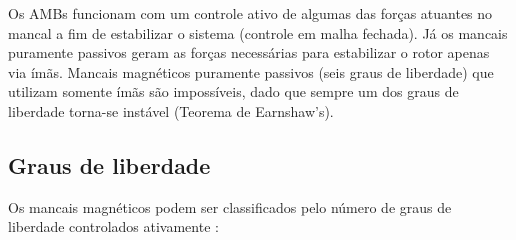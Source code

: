 Os AMBs funcionam com um controle ativo de algumas das forças atuantes no mancal a fim de estabilizar o sistema (controle em malha fechada). Já os mancais puramente passivos geram as forças necessárias para estabilizar o rotor apenas via ímãs.
Mancais magnéticos puramente passivos (seis graus de liberdade) que utilizam somente ímãs são impossíveis, dado que sempre um dos graus de liberdade torna-se instável (Teorema de Earnshaw's).


\subsection{Graus de liberdade}

Os mancais magnéticos podem ser classificados pelo número de graus de liberdade controlados ativamente \citep{Schweitzer2009}:

